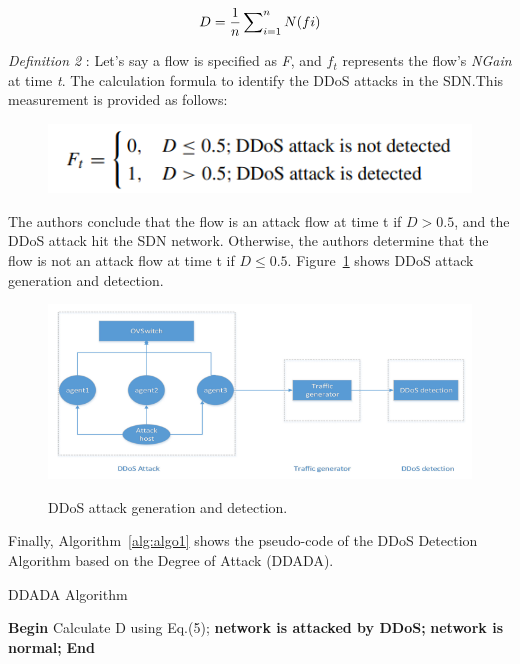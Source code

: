 \documentclass[12pt]{report}
\begin{document}
\begin{equation}
    {D = \frac{1}{n}\sum _{i=1}^{n} \nolimits N(fi)}
    \label{eqn:eqn5}
\end{equation}

\emph{Definition 2} : Let's say a flow is specified as \emph{F}, and \emph{$f_{t}$} represents the flow's \emph{NGain} at time \emph{t}. The calculation formula to identify the DDoS attacks in the SDN.This measurement is provided as follows: \\

\begin{figure}[H]
    \centering
    \includegraphics[scale=0.4]{fig8.png}
\end{figure}

The authors conclude that the flow is an attack flow at time t if $D > 0.5$, and the DDoS attack hit the SDN network. Otherwise, the authors determine that the flow is not an attack flow at time t if $D\leq 0.5$. Figure~\ref{fig:gener} shows DDoS attack generation and detection. \\

\begin{figure}[H]
    \centering
    \includegraphics[scale=0.5]{fig9.png}\\
    \caption{DDoS attack generation and detection.}
    \label{fig:gener}
\end{figure}

Finally, Algorithm~\ref{alg:algo1} shows the pseudo-code of the DDoS Detection Algorithm based on the Degree of Attack (DDADA).

\begin{center}
\begin{minipage}{0.5\textwidth}
  \begin{algorithm}[H]
\caption{DDADA Algorithm}
\label{alg:algo1}
\begin{algorithmic}[1]
    \State \textbf{Begin}
    \State Calculate D using Eq.(5);
    \State \textbf{network is attacked by DDoS;}
    \Else
    \State \textbf{network is normal;}
    \EndIf
    \EndIf
    \State \textbf{End}
\end{algorithmic}
\end{algorithm}  
\end{minipage}
\end{center}
\end{document}
